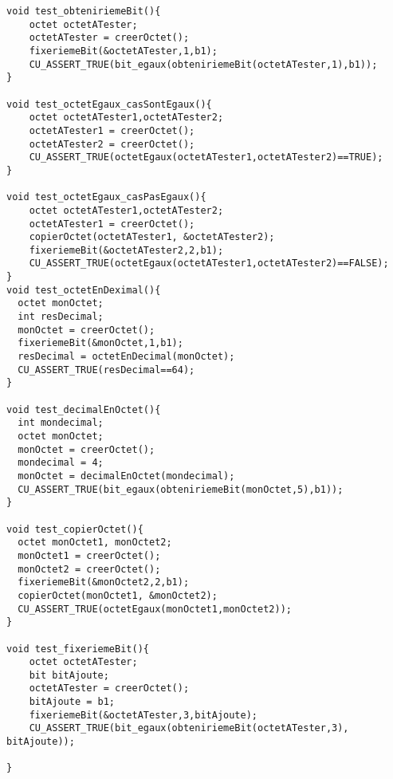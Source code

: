 \begin{verbatim}
void test_obteniriemeBit(){
	octet octetATester;
	octetATester = creerOctet();
	fixeriemeBit(&octetATester,1,b1);
	CU_ASSERT_TRUE(bit_egaux(obteniriemeBit(octetATester,1),b1));
}

void test_octetEgaux_casSontEgaux(){
	octet octetATester1,octetATester2;
	octetATester1 = creerOctet();
	octetATester2 = creerOctet();
	CU_ASSERT_TRUE(octetEgaux(octetATester1,octetATester2)==TRUE);
}

void test_octetEgaux_casPasEgaux(){
	octet octetATester1,octetATester2;
	octetATester1 = creerOctet();
	copierOctet(octetATester1, &octetATester2);
	fixeriemeBit(&octetATester2,2,b1);
	CU_ASSERT_TRUE(octetEgaux(octetATester1,octetATester2)==FALSE);
}
void test_octetEnDeximal(){
  octet monOctet;
  int resDecimal;
  monOctet = creerOctet();
  fixeriemeBit(&monOctet,1,b1);
  resDecimal = octetEnDecimal(monOctet);
  CU_ASSERT_TRUE(resDecimal==64);
}

void test_decimalEnOctet(){
  int mondecimal;
  octet monOctet;
  monOctet = creerOctet();
  mondecimal = 4;
  monOctet = decimalEnOctet(mondecimal);
  CU_ASSERT_TRUE(bit_egaux(obteniriemeBit(monOctet,5),b1));
}

void test_copierOctet(){
  octet monOctet1, monOctet2;
  monOctet1 = creerOctet();
  monOctet2 = creerOctet();
  fixeriemeBit(&monOctet2,2,b1);
  copierOctet(monOctet1, &monOctet2);
  CU_ASSERT_TRUE(octetEgaux(monOctet1,monOctet2));
}

void test_fixeriemeBit(){
	octet octetATester;
	bit bitAjoute;
	octetATester = creerOctet();
	bitAjoute = b1;
	fixeriemeBit(&octetATester,3,bitAjoute);
	CU_ASSERT_TRUE(bit_egaux(obteniriemeBit(octetATester,3), bitAjoute));

}
\end{verbatim}
 
